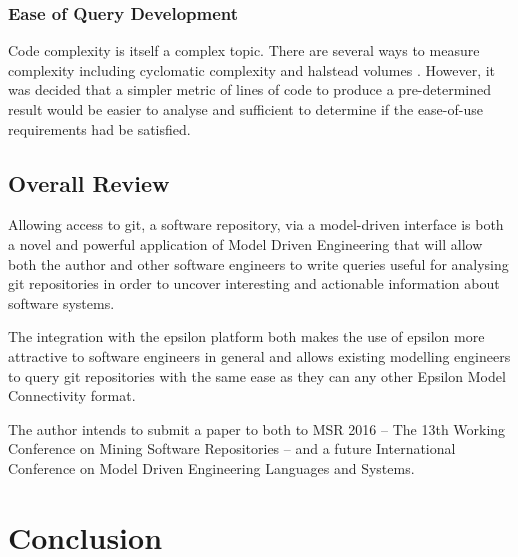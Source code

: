 \documentclass[11pt]{book}
\begin{document}
 


\subsection{Ease of Query Development}
Code complexity is itself a complex topic. There are several ways to measure complexity including cyclomatic complexity and halstead volumes \cite{halstead}. However, it was decided that a simpler metric of lines of code to produce a pre-determined result would be easier to analyse and sufficient to determine if the ease-of-use requirements had be satisfied.


\section{Overall Review}
Allowing access to git, a software repository, via a model-driven interface is both a novel and powerful application of Model Driven Engineering that will allow both the author and other software engineers to write queries useful for analysing git repositories in order to uncover interesting and actionable information about software systems.

The integration with the epsilon platform both makes the use of epsilon more attractive to software engineers in general and allows existing modelling engineers to query git repositories with the same ease as they can any other Epsilon Model Connectivity format.

The author intends to submit a paper to both to MSR 2016 -- The 13th Working Conference on Mining Software Repositories \cite{msr2016} -- and a future International Conference on Model Driven Engineering Languages and Systems.


\chapter{Conclusion}
\end{document}
